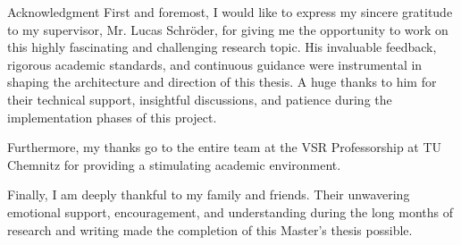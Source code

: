 \vspace*{0pt plus 1fill}
\begin{tucsimplesection}{Acknowledgment}
First and foremost, I would like to express my sincere gratitude to my supervisor, Mr. Lucas Schröder, for giving me the opportunity to work on this highly fascinating and challenging research topic. His invaluable feedback, rigorous academic standards, and continuous guidance were instrumental in shaping the architecture and direction of this thesis. A huge thanks to him for their technical support, insightful discussions, and patience during the implementation phases of this project.

Furthermore, my thanks go to the entire team at the VSR Professorship at TU Chemnitz for providing a stimulating academic environment.

Finally, I am deeply thankful to my family and friends. Their unwavering emotional support, encouragement, and understanding during the long months of research and writing made the completion of this Master’s thesis possible.
\end{tucsimplesection}
\vspace*{0pt plus 2.5fill}

